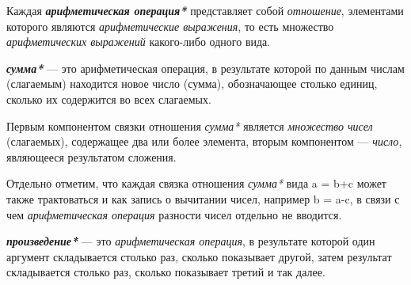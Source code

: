 \begin{SCn}
\end{SCn}

\begin{SCn}
\end{SCn}

Каждая \textbf{\textit{арифметическая операция*}} представляет собой \textit{отношение}, элементами которого являются \textit{арифметические выражения}, то есть множество \textit{арифметических выражений} какого-либо одного вида.
	
\begin{SCn}
\end{SCn}

\textbf{\textit{сумма*}} --- это арифметическая операция, в результате которой по данным числам (слагаемым) находится новое число (сумма), обозначающее столько единиц, сколько их содержится во всех слагаемых.
		
Первым компонентом связки отношения \textit{сумма*} является \textit{множество чисел} (слагаемых), содержащее два или более элемента, вторым компонентом --- \textit{число}, являющееся результатом сложения.
		
Отдельно отметим, что каждая связка отношения \textit{сумма*} вида a = b+c может также трактоваться и как запись о вычитании чисел, например b = a-c, в связи с чем \textit{арифметическая операция} разности чисел отдельно не вводится.

\begin{SCn}
\end{SCn}

\textbf{\textit{произведение*}} --- это \textit{арифметическая операция}, в результате которой один аргумент складывается столько раз, сколько показывает другой, затем результат складывается столько раз, сколько показывает третий и так далее.
		
